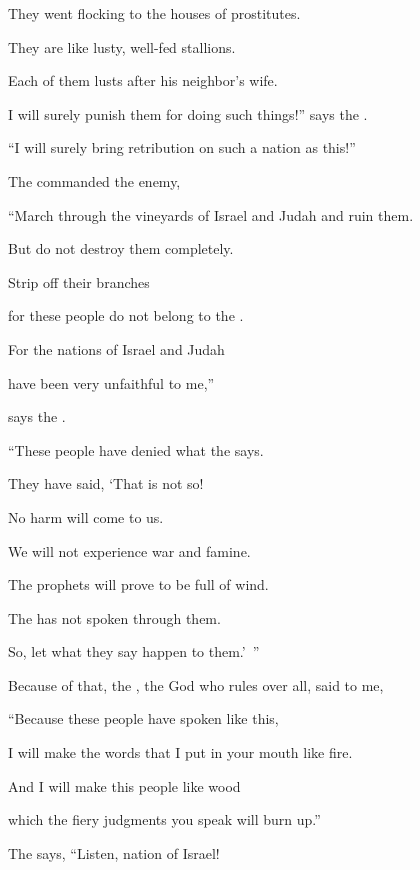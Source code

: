 {\par }{\Q They
went flocking
to the houses
of prostitutes.
\par }{\Q {}They are
like lusty,
well-fed
stallions.
\par }{\Q Each
of them lusts
after his neighbor’s
wife.
\par }{\Q {}I will surely
punish
them for doing such things!” says
the {}.
\par }{\Q “I will surely bring retribution
on
such
a nation
as
this!”
\par }{\Q {}The
{} commanded
the enemy,

\par }{\Q “March
through the vineyards of Israel and Judah and ruin
them.

\par }{\Q But do not
destroy
them completely.
\par }{\Q Strip off
their branches
\par }{\Q for
these people do not
belong to the
{}.
\par }{\Q {}For
the nations
of Israel
and Judah
\par }{\Q have been very unfaithful
to me,”
\par }{\PP says
the {}.
\par }{\Q {}“These people have denied
what the
{}
says.

\par }{\Q They have said,
‘That is
not
so!

\par }{\Q No
harm
will come
to us.
\par }{\Q We will not
experience
war
and famine.
\par }{\Q {}The prophets
will prove to be
full of wind.
\par }{\Q The
{} has not
spoken through
them.

\par }{\Q So, let
what they say happen to them.’ ”
\par }{\PP {}Because of
that,
the {}, the God
who rules over all,
said
to me,

\par }{\Q “Because
these people have spoken
like this,
\par }{\Q I will make
the words
that I put in your mouth
like fire.
\par }{\Q And I will make this
people
like wood
\par }{\Q which the fiery judgments you speak will burn up.”
\par }{\Q {}The
{}
says, “Listen,
nation
of Israel!

}
